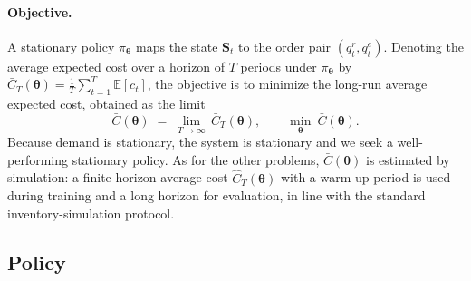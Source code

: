 \documentclass[11pt]{article}
\newcommand{\btheta}{\boldsymbol{\theta}}
\begin{document}
\paragraph{Objective.}
A stationary policy $\pi_{\btheta}$ maps the state $\mathbf{S}_t$ to the order pair
$(q^r_t,q^e_t)$. Denoting the average expected cost over a horizon of $T$ periods under
$\pi_{\btheta}$ by $\bar C_T(\btheta)=\tfrac{1}{T}\sum_{t=1}^{T}\mathbb{E}[c_t]$, the objective is to
minimize the long-run average expected cost, obtained as the limit
\begin{equation}
    \label{ds_objective}
    \bar C(\btheta) \;=\; \lim_{T\to\infty}\,\bar C_T(\btheta),
    \qquad \min_{\btheta}\ \bar C(\btheta).
\end{equation}
Because demand is stationary, the system is stationary and we seek a well-performing stationary
policy. As for the other problems, $\bar C(\btheta)$ is estimated by simulation: a finite-horizon
average cost $\hat C_T(\btheta)$ with a warm-up period is used during training and a long horizon for
evaluation, in line with the standard inventory-simulation protocol.

\FloatBarrier

\subsection{Policy}
\label{sec:dual-policy}
\end{document}

